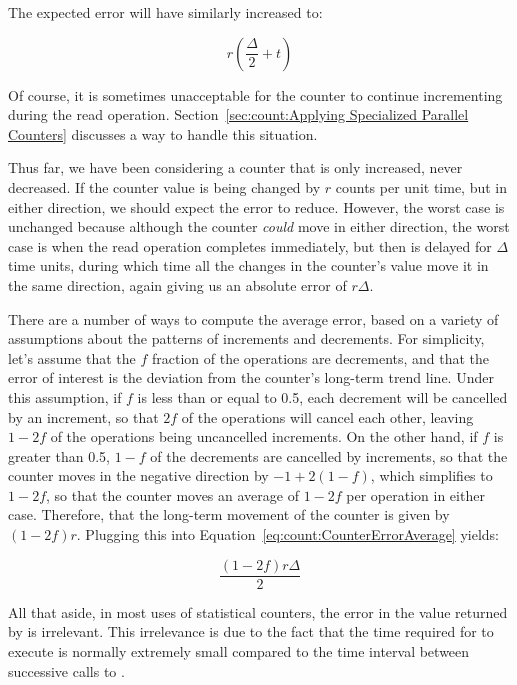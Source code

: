 {	The expected error will have similarly increased to:

	\begin{equation}
		r \left( \frac{\Delta}{2} + t \right)
	\end{equation}

	Of course, it is sometimes unacceptable for the counter to
	continue incrementing during the read operation.
	Section~\ref{sec:count:Applying Specialized Parallel Counters}
	discusses a way to handle this situation.

	Thus far, we have been considering a counter that is only
	increased, never decreased.
	If the counter value is being changed by $r$ counts per unit
	time, but in either direction, we should expect the error
	to reduce.
	However, the worst case is unchanged because although the
	counter \emph{could} move in either direction, the worst
	case is when the read operation completes immediately,
	but then is delayed for $\Delta$ time units, during which
	time all the changes in the counter's value move it in
	the same direction, again giving us an absolute error
	of $r \Delta$.

	There are a number of ways to compute the average error,
	based on a variety of assumptions about the patterns of
	increments and decrements.
	For simplicity, let's assume that the $f$ fraction of
	the operations are decrements, and that the error of interest
	is the deviation from the counter's long-term trend line.
	Under this assumption, if $f$ is less than or equal to 0.5,
	each decrement will be cancelled by an increment, so that
	$2f$ of the operations will cancel each other, leaving
	$1-2f$ of the operations being uncancelled increments.
	On the other hand, if $f$ is greater than 0.5, $1-f$ of
	the decrements are cancelled by increments, so that the
	counter moves in the negative direction by $-1+2\left(1-f\right)$,
	which simplifies to $1-2f$, so that the counter moves an average
	of $1-2f$ per operation in either case.
	Therefore, that the long-term
	movement of the counter is given by $\left( 1-2f \right) r$.
	Plugging this into
	Equation~\ref{eq:count:CounterErrorAverage} yields:

	\begin{equation}
		\frac{\left( 1 - 2 f \right) r \Delta}{2}
	\end{equation}

	All that aside, in most uses of statistical counters, the
	error in the value returned by  is
	irrelevant.
	This irrelevance is due to the fact that the time required
	for  to execute is normally extremely
	small compared to the time interval between successive
	calls to .
} \QuickQuizEnd


